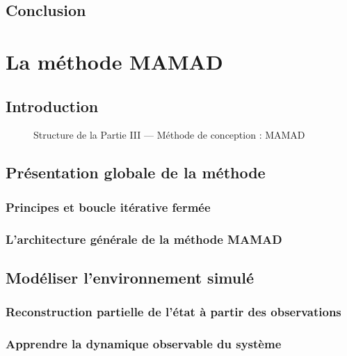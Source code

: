 \documentclass[ twoside,openright,titlepage,numbers=noenddot,headinclude,%
                footinclude=true,cleardoublepage=empty,abstractoff, %
                BCOR=5mm,paper=a4,fontsize=11pt,%
                french,american,%
                ]{scrreprt}
\begin{document}
\chapter*{Conclusion}

\cleardoublepage
{}
{}
\part{La méthode MAMAD}

\chapter*{Introduction}

\begin{figure}[h!]
    \centering
    
    \caption{Structure de la Partie III — Méthode de conception : MAMAD}
\end{figure}

\chapter{Présentation globale de la méthode}

\section{Principes et boucle itérative fermée}

\section{L'architecture générale de la méthode MAMAD}

\chapter{Modéliser l'environnement simulé}
\section{Reconstruction partielle de l'état à partir des observations}
\section{Apprendre la dynamique observable du système}
\end{document}
